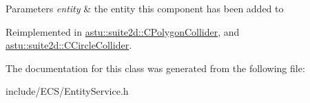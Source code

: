 \begin{DoxyParams}{Parameters}
{\em entity} & the entity this component has been added to \\
\hline
\end{DoxyParams}


Reimplemented in \hyperlink{classastu_1_1suite2d_1_1CPolygonCollider_ac30165a676e92f89e1a840f858d9a050}{astu\+::suite2d\+::\+C\+Polygon\+Collider}, and \hyperlink{classastu_1_1suite2d_1_1CCircleCollider_aa77499480ca5f7d49f6331986b675a46}{astu\+::suite2d\+::\+C\+Circle\+Collider}.



The documentation for this class was generated from the following file\+:\begin{DoxyCompactItemize}
\item 
include/\+E\+C\+S/Entity\+Service.\+h\end{DoxyCompactItemize}
